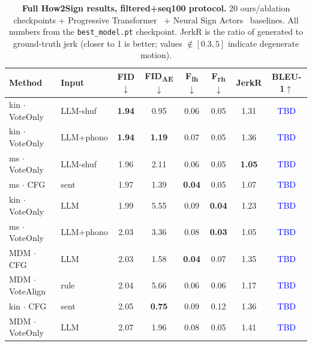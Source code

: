 \documentclass{article}
\newcommand{\placeholder}[1]{\textcolor{blue}{#1}}
\begin{document}
\begin{table}[h]
  \caption{\textbf{Full How2Sign results, filtered+seq100 protocol.} 20 ours/ablation checkpoints + Progressive Transformer~\citep{saunders2020progressive} + Neural Sign Actors~\citep{baltatzis2024neural} baselines. All numbers from the \texttt{best\_model.pt} checkpoint. JerkR is the ratio of generated to ground-truth jerk (closer to 1 is better; values $\notin [0.3, 5]$ indicate degenerate motion).}
  \label{tab:h2s_full}
  \centering
  \scriptsize
  \begin{tabular}{llcccccc}
    \toprule
    \textbf{Method} & \textbf{Input} & \textbf{FID}$\downarrow$ & \textbf{FID\textsubscript{AE}}$\downarrow$ & \textbf{F\textsubscript{lh}}$\downarrow$ & \textbf{F\textsubscript{rh}}$\downarrow$ & \textbf{JerkR} & \textbf{BLEU-1}$\uparrow$ \\
    \midrule
    kin $\cdot$ VoteOnly       & LLM-shuf       & \textbf{1.94} & 0.95          & 0.06          & 0.05          & 1.31 & \placeholder{TBD} \\
    kin $\cdot$ VoteOnly       & LLM+phono      & \textbf{1.94} & \textbf{1.19} & 0.07          & 0.05          & 1.36 & \placeholder{TBD} \\
    ms $\cdot$ VoteOnly        & LLM-shuf       & 1.96          & 2.11          & 0.06          & 0.05          & \textbf{1.05} & \placeholder{TBD} \\
    ms $\cdot$ CFG             & sent           & 1.97          & 1.39          & \textbf{0.04} & 0.05          & 1.07 & \placeholder{TBD} \\
    kin $\cdot$ VoteOnly       & LLM            & 1.99          & 5.55          & 0.09          & \textbf{0.04} & 1.23 & \placeholder{TBD} \\
    ms $\cdot$ VoteOnly        & LLM+phono      & 2.03          & 3.36          & 0.08          & \textbf{0.03} & 1.05 & \placeholder{TBD} \\
    MDM $\cdot$ CFG            & LLM            & 2.03          & 1.58          & \textbf{0.04} & 0.07          & 1.35 & \placeholder{TBD} \\
    MDM $\cdot$ VoteAlign   & rule           & 2.04          & 5.66          & 0.06          & 0.06          & 1.17 & \placeholder{TBD} \\
    kin $\cdot$ CFG            & sent           & 2.05          & \textbf{0.75} & 0.09          & 0.12          & 1.36 & \placeholder{TBD} \\
    MDM $\cdot$ VoteOnly       & LLM            & 2.07          & 1.96          & 0.08          & 0.05          & 1.41 & \placeholder{TBD} \\

\end{tabular}
\end{table}
\end{document}
